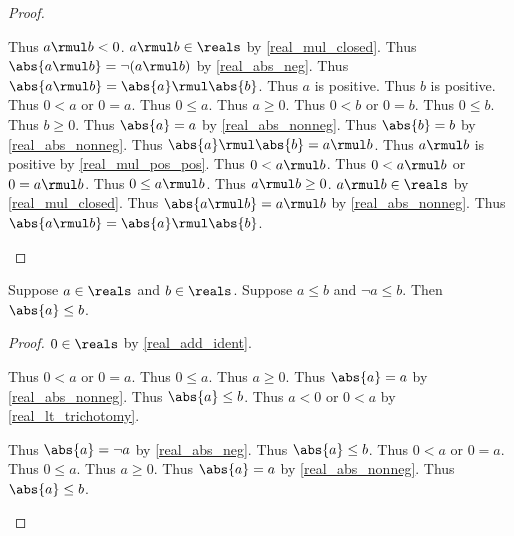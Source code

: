 \begin{proof}
\begin{byCase}
\begin{byCase}
\begin{byCase}
                Thus $a \rmul b < 0$.
                $a \rmul b\in\reals$ by \cref{real_mul_closed}.
                Thus $\abs{a \rmul b} = \neg{(a \rmul b)}$ by \cref{real_abs_neg}.
                Thus $\abs{a \rmul b} = \abs{a} \rmul \abs{b}$.
                Thus $a$ is positive.
                Thus $b$ is positive.
                Thus $0 < a$ or $0 = a$.
                Thus $0 \leq a$.
                Thus $a \geq 0$.
                Thus $0 < b$ or $0 = b$.
                Thus $0 \leq b$.
                Thus $b \geq 0$.
                Thus $\abs{a} = a$ by \cref{real_abs_nonneg}.
                Thus $\abs{b} = b$ by \cref{real_abs_nonneg}.
                Thus $\abs{a} \rmul \abs{b} = a \rmul b$.
                Thus $a \rmul b$ is positive by \cref{real_mul_pos_pos}.
                Thus $0 < a \rmul b$.
                Thus $0 < a \rmul b$ or $0 = a \rmul b$.
                Thus $0 \leq a \rmul b$.
                Thus $a \rmul b \geq 0$.
                $a \rmul b\in\reals$ by \cref{real_mul_closed}.
                Thus $\abs{a \rmul b} = a \rmul b$ by \cref{real_abs_nonneg}.
                Thus $\abs{a \rmul b} = \abs{a} \rmul \abs{b}$.
            \end{byCase}
        \end{byCase}
    \end{byCase}
\end{proof}

\begin{theorem}\label{real_abs_leq_if_pm_leq}
    Suppose $a\in\reals$ and $b\in\reals$.
    Suppose $a \leq b$ and $\neg{a} \leq b$.
    Then $\abs{a} \leq b$.
\end{theorem}
\begin{proof}
    $0\in\reals$ by \cref{real_add_ident}.
    \begin{byCase}
        Thus $0 < a$ or $0 = a$.
        Thus $0 \leq a$.
        Thus $a \geq 0$.
        Thus $\abs{a} = a$ by \cref{real_abs_nonneg}.
        Thus $\abs{a} \leq b$.
        Thus $a < 0$ or $0 < a$ by \cref{real_lt_trichotomy}.
        \begin{byCase}
            Thus $\abs{a} = \neg{a}$ by \cref{real_abs_neg}.
            Thus $\abs{a} \leq b$.
            Thus $0 < a$ or $0 = a$.
            Thus $0 \leq a$.
            Thus $a \geq 0$.
            Thus $\abs{a} = a$ by \cref{real_abs_nonneg}.
            Thus $\abs{a} \leq b$.
        \end{byCase}
    \end{byCase}
\end{proof}

